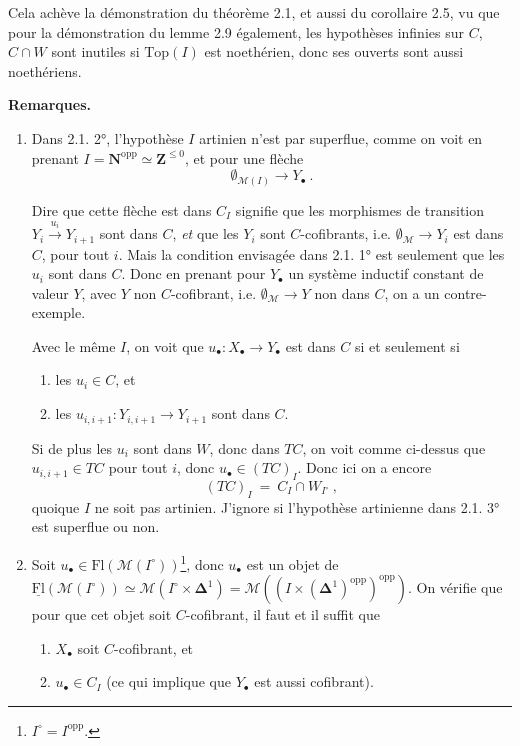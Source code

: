 \documentclass[11pt]{article}
\newcommand{\printedpage}[1]{\marginpar{\footnotesize p.~#1}}
\newcommand{\msp}[1]{\marginpar{\footnotesize [#1]}}
\newcommand{\M}{\mathcal{M}}
\begin{document}
Cela achève la démonstration du théorème 2.1, et aussi du corollaire 2.5, vu que pour la démonstration du lemme 2.9 également, les hypothèses infinies sur $C$, $C \cap W$ sont inutiles si $\mathrm{Top}(I)$ est noethérien, donc ses ouverts sont aussi noethériens.

\noindent\textbf{Remarques.}
\begin{enumerate}[leftmargin=2.5em]
\item[1)] Dans 2.1. 2°, l'hypothèse $I$ artinien n'est par superflue, comme on voit en prenant $I = \mathbf{N}^{\mathrm{opp}} \simeq \mathbf{Z}^{\leq 0}$, \msp{38} et pour une flèche %
\[ \emptyset_{\M(I)} \longrightarrow Y_\bullet\ . \]

Dire que cette flèche est dans $C_I$ signifie que les morphismes de transition $Y_i \xrightarrow{u_i} Y_{i+1}$ sont dans $C$, \textit{et} que les $Y_i$ sont $C$-cofibrants, i.e. $\emptyset_{\M} \longrightarrow Y_i$ est dans $C$, pour tout $i$. Mais la condition envisagée dans 2.1. 1° est seulement que les $u_i$ sont dans $C$. Donc en prenant pour $Y_\bullet$ un système inductif constant de valeur $Y$, avec $Y$ non $C$-cofibrant, i.e. $\emptyset_{\M} \longrightarrow Y$ non dans $C$, on a un contre-exemple.

Avec le même $I$, on voit que $u_\bullet : X_\bullet \longrightarrow Y_\bullet$ est dans $C$ si et seulement si
\begin{enumerate}[leftmargin=2.5em]
\item[a)] les $u_i \in C$, et
\item[b)] les $u_{i,i+1} : Y_{i,i+1} \longrightarrow Y_{i+1}$ sont dans $C$.
\end{enumerate}

\printedpage{21}

Si de plus les $u_i$ sont dans $W$, donc dans $TC$, on voit comme ci-dessus que $u_{i,i+1} \in TC$ pour tout $i$, donc $u_\bullet \in (TC)_I$. Donc ici on a encore
\[ (TC)_I \ = \ C_I \cap W_{I^\circ}\ , \]
quoique $I$ ne soit pas artinien. J'ignore si l'hypothèse artinienne dans 2.1. 3° est superflue ou non.
\item[2)] Soit $u_\bullet \in \mathrm{Fl}(\M(I^\circ))$\footnote[13]{$I^\circ = I^{\mathrm{opp}}$.}, donc $u_\bullet$ est un objet de $\underline{\mathrm{Fl}}(\M(I^\circ)) \simeq \M(I^\circ \times \boldsymbol{\Delta}^1) = \M((I \times (\boldsymbol{\Delta}^1)^{\mathrm{opp}})^{\mathrm{opp}})$. On vérifie que pour que cet objet soit $C$-cofibrant, il faut et il suffit que
\begin{enumerate}[leftmargin=2.5em]
\item[1°)] $X_\bullet$ soit $C$-cofibrant, et
\item[2°)] $u_\bullet \in C_I$ (ce qui implique que $Y_\bullet$ est aussi cofibrant).
\end{enumerate}
\end{enumerate}
\msp{39}
\end{document}
